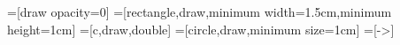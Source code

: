 =[draw opacity=0]
=[rectangle,draw,minimum width=1.5cm,minimum height=1cm]
=[c,draw,double]
=[circle,draw,minimum size=1cm]
=[->]


